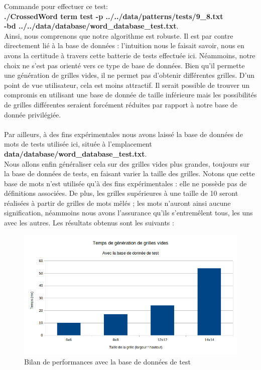 \documentclass [ 11 pt ] {article}
\begin{document}
        Commande pour effectuer ce test:\\ \textbf{./CrossedWord term test -p  ../../data/patterns/tests/9\_8.txt \\ -bd ../../data/database/word\_database\_test.txt}. \\
        
        Ainsi, nous comprenons que notre algorithme est robuste. Il est par contre directement lié à la base de données : l'intuition nous le faisait savoir, nous en avons la certitude à travers cette batterie de tests effectuée ici. Néammoins, notre choix ne s'est pas orienté vers ce type de base de données. Bien qu'il permette une génération de grilles vides, il ne permet pas d'obtenir différentes grilles. D'un point de vue utilisateur, cela est moins attractif. Il serait possible de trouver un compromis en utilisant une base de donnée de taille inférieure mais les possibilités de grilles différentes seraient forcément réduites par rapport à notre base de donnée privilégiée. \\ \\
        
        Par ailleurs, à des fins expérimentales nous avons laissé la base de données de mots de tests utilisée ici, située à l'emplacement \textbf{data/database/word\_database\_test.txt}. \\
        
        Nous allons enfin généraliser cela sur des grilles vides plus grandes, toujours sur la base de données de tests, en faisant varier la taille des grilles. Notons que cette base de mots n'est utilisée qu'à des fins expérimentales : elle ne possède pas de définitions associées. De plus, les grilles supérieures à une taille de 10 seront réalisées à partir de grilles de mots mêlés ; les mots n'auront ainsi aucune signification, néammoins nous avons l'assurance qu'ils s'entremêlent tous, les uns avec les autres. Les résultats obtenus sont les suivants : 
        
        \begin{figure}[H] 
            \center 
            \includegraphics[width=0.7\linewidth]{Grid_time.png}
            \caption{Bilan de performances avec la base de données de test}
        \end{figure}
        
\end{document}
